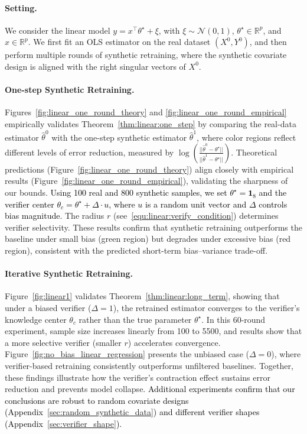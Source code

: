 \paragraph{Setting.}
We consider the linear model $y =  x^{\top}\theta^\star + \xi$, with $\xi \sim \mathcal{N}(0,1)$, $\theta^\star \in \mathbb{R}^p$, and $x \in \mathbb{R}^p$. 
We first fit an OLS estimator on the real dataset $(X^0, Y^0)$, and then perform multiple rounds of synthetic retraining,
where the synthetic covariate design is aligned with the right singular vectors of $X^0$.
\vspace{-3mm}
\paragraph{One-step Synthetic Retraining.}
Figures~\ref{fig:linear_one_round_theory} and \ref{fig:linear_one_round_empirical} empirically validates Theorem~\ref{thm:linear:one_step} by comparing the real-data estimator $\hat{\theta}^0$ with the one-step synthetic estimator $\hat{\theta}^1$, where color regions reflect different levels of error reduction, measured by $\log(\frac{||\hat{\theta}^0 - \theta^\star|| }{||\hat{\theta}^1 - \theta^\star||})$.
Theoretical predictions (Figure~\ref{fig:linear_one_round_theory}) align closely with empirical results (Figure~\ref{fig:linear_one_round_empirical}), validating the sharpness of our bounds.
\textcolor{black}{Using 100 real and 800 synthetic samples, we set $\theta^\star = \mathbf{1}_8$ and the verifier center $\theta_c = \theta^\star + \Delta \cdot u$, where $u$ is a random unit vector and $\Delta$ controls bias magnitude.}
The radius $r$ (see~\eqref{equ:linear:verify_condition}) determines verifier selectivity.
These results confirm that synthetic retraining outperforms the baseline under small bias (green region) but degrades under excessive bias (red region), consistent with the predicted short-term bias--variance trade-off.

\vspace{-3mm}
\paragraph{Iterative Synthetic Retraining.}
Figure~\ref{fig:linear1} validates Theorem~\ref{thm:linear:long_term}, showing that under a biased verifier ($\Delta=1$), the retrained estimator converges to the verifier's knowledge center $\theta_c$ rather than the true parameter $\theta^\star$.
In this 60-round experiment, sample size increases linearly from 100 to 5500, and results show that a more selective verifier (smaller $r$) accelerates convergence.
Figure~\ref{fig:no_bias_linear_regression} presents the unbiased case ($\Delta=0$), where verifier-based retraining consistently outperforms unfiltered baselines.
Together, these findings illustrate how the verifier's contraction effect sustains error reduction and prevents model collapse.
\textcolor{black}{Additional experiments confirm that our conclusions are robust to random covariate designs (Appendix~\ref{sec:random_synthetic_data}) and different verifier shapes (Appendix~\ref{sec:verifier_shape}).}


